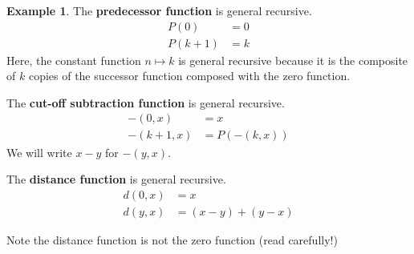 \documentclass[12pt]{article}
\theoremstyle{plain}
\theoremstyle{definition}
\newtheorem{example}[thm]{Example}
\begin{document}
	\begin{example}\label{ex:basic_prim_rec}
		The \textbf{predecessor function} is general recursive.
		\begin{align*}
			P(0) &= 0\\
			P(k+1) &= k
		\end{align*}
		Here, the constant function $n \longmapsto k$ is general recursive because it is the composite of $k$ copies of the successor function composed with the zero function.
		
		The \textbf{cut-off subtraction function} is general recursive.
		\begin{align*}
			-(0,x) &= x\\
			-(k+1,x) &= P(-(k,x))
		\end{align*}
		We will write $x - y$ for $-(y,x)$.
		
		The \textbf{distance function} is general recursive.
		\begin{align*}
			d(0,x) &= x\\
			d(y,x) &= (x - y) + (y - x)
		\end{align*}
	\end{example}
Note the distance function is not the zero function (read carefully!)
\end{document}
